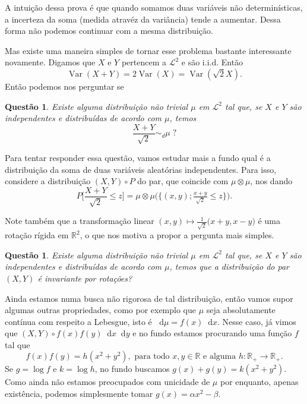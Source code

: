 \documentclass[reqno, final]{book}
\newcommand*\1{\mathds{1}}
\newtheorem{question}[theorem]{Questão}
\DeclareMathOperator{\Var}{Var}
\def \distr{\sim_d}
\renewcommand*\d{\mathop{}\!\mathrm{d}}
\begin{document}
A intuição dessa prova é que quando somamos duas variáveis não determinísticas, a incerteza da soma (medida atravéz da variância) tende a aumentar.
Dessa forma não podemos continuar com a mesma distribuição.

Mas existe uma maneira simples de tornar esse problema bastante interessante novamente.
Digamos que $X$ e $Y$ pertencem a $\mathcal{L}^2$ e são i.i.d.
Então
\begin{equation}
  \Var(X + Y) = 2 \Var(X) = \Var(\sqrt{2} X).
\end{equation}
Então podemos nos perguntar se

\begin{question}
  \label{q:ponto_fixo_soma}
  Existe alguma distribuição não trivial $\mu$ em $\mathcal{L}^2$ tal que, se $X$ e $Y$ são independentes e distribuídas de acordo com $\mu$, temos
  \begin{equation}
    \frac{X + Y}{\sqrt{2}} \distr \mu \; ?
  \end{equation}
\end{question}

Para tentar responder essa questão, vamos estudar mais a fundo qual é a distribuição da soma de duas variáveis aleatórias independentes.
Para isso, considere a distribuição $(X,Y) \circ P$ do par, que coincide com $\mu \otimes \mu$, nos dando
\begin{equation}
  P\Big[ \frac{X + Y}{\sqrt{2}} \leq z \Big] = \mu \otimes \mu \big( \big\{(x, y); \tfrac{x + y}{\sqrt{2}} \leq z \big\} \big).
\end{equation}

Note também que a transformação linear $(x,y) \mapsto \tfrac{1}{\sqrt{2}}\big(x + y, x - y\big)$ é uma rotação rígida em $\mathbb{R}^2$, o que nos motiva a propor a pergunta mais simples.

\begin{question}
  Existe alguma distribuição não trivial $\mu$ em $\mathcal{L}^2$ tal que, se $X$ e $Y$ são independentes e distribuídas de acordo com $\mu$, temos que a distribuição do par $(X,Y)$ é invariante por rotações?
\end{question}

Ainda estamos numa busca não rigorosa de tal distribuição, então vamos supor algumas outras propriedades, como por exemplo que $\mu$ seja absolutamente contínua com respeito a Lebesgue, isto é $\d \mu = f(x) \d x$.
Nesse caso, já vimos que $(X, Y) \circ f(x) f(y) \d x \d y$ e no fundo estamos procurando uma função $f$ tal que
\begin{equation}
  f(x) f(y) = h(x^2 + y^2), \text{ para todo $x, y \in \mathbb{R}$ e alguma $h: \mathbb{R}_+ \to \mathbb{R}_+$.}
\end{equation}
Se $g = \log f$ e $k = \log h$, no fundo buscamos $g(x) + g(y) = k(x^2 + y^2)$.
Como ainda não estamos preocupados com unicidade de $\mu$ por enquanto, apenas existência, podemos simplesmente tomar $g(x) = \alpha x^2 - \beta$.
\end{document}
